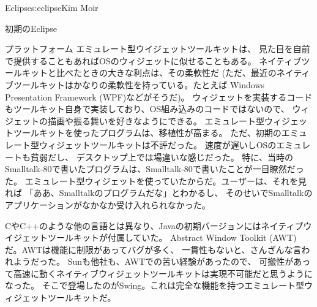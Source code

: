 \begin{aosachapter}{Eclipse}{s:eclipse}{Kim Moir}
\begin{aosasect1}{初期のEclipse}
\begin{aosasect2}{プラットフォーム}
エミュレート型ウイジェットツールキットは、
見た目を自前で提供することもあればOSのウィジェットに似せることもある。
ネイティブツールキットと比べたときの大きな利点は、その柔軟性だ
(ただ、最近のネイティブツールキットはかなりの柔軟性を持っている。たとえば
Windows Presentation Framework (WPF)などがそうだ)。
ウィジェットを実装するコードもツールキット自身で実装しており、OS組み込みのコードではないので、
ウィジェットの描画や振る舞いを好きなようにできる。
エミュレート型ウィジェットツールキットを使ったプログラムは、移植性が高まる。
ただ、初期のエミュレート型ウィジェットツールキットは不評だった。
速度が遅いしOSのエミュレートも貧弱だし、
デスクトップ上では場違いな感じだった。
特に、当時のSmalltalk-80で書いたプログラムは、Smalltalk-80で書いたことが一目瞭然だった。
エミュレート型ウィジェットを使っていたからだ。ユーザーは、それを見れば
「ああ、Smalltalkのプログラムだな」とわかるし、
そのせいでSmalltalkのアプリケーションがなかなか受け入れられなかった。

CやC++のような他の言語とは異なり、Javaの初期バージョンにはネイティブウイジェットツールキットが付属していた。
Abstract Window Toolkit (AWT)だ。AWTは機能に制限があってバグが多く、
一貫性もないと、さんざんな言われようだった。
Sunも他社も、AWTでの苦い経験があったので、
可搬性があって高速に動くネイティブウィジェットツールキットは実現不可能だと思うようになった。
そこで登場したのがSwing。これは完全な機能を持つエミュレート型ウィジェットツールキットだ。


\end{aosasect2}
\end{aosasect1}
\end{aosachapter}
